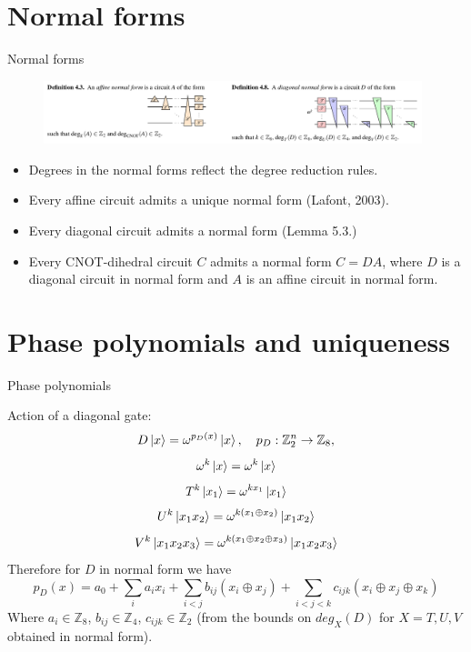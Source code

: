 \documentclass{beamer}
\theoremstyle{definition}
\begin{document}
\section{Normal forms}

\begin{frame}{Normal forms}

\begin{figure}
\includegraphics[width=11cm]{normal-forms}
\centering
\end{figure}
\begin{itemize}
\item Degrees in the normal forms reflect the degree reduction rules.
\item Every affine circuit admits a unique normal form (Lafont, 2003).
\item Every diagonal circuit admits a normal form (Lemma 5.3.)
\item Every CNOT-dihedral circuit $C$ admits a normal form $C=DA$, where $D$ is a diagonal circuit in normal form and $A$ is an affine circuit in normal form.
\end{itemize}
\end{frame}

\section{Phase polynomials and uniqueness}

\begin{frame}{Phase polynomials}

Action of a diagonal gate:
$$ D \ket{x} = \omega^{p_D(x)}\ket{x}, \quad p_D: \mathbb{Z}_2^n \rightarrow \mathbb{Z}_8 ,$$
$$ \omega^k \ket{x} = \omega^k \ket{x} $$
$$ T^k \ket{x_1} = \omega^{kx_1}\ket{x_1}$$
$$ U^k \ket{x_1x_2} = \omega^{k(x_1\oplus x_2)}\ket{x_1x_2}$$
$$ V^k \ket{x_1x_2x_3} = \omega^{k(x_1\oplus x_2 \oplus x_3)}\ket{x_1x_2x_3}$$
Therefore for $D$ in normal form we have
$$ p_D(x) = a_0 + \sum_i a_i x_i + \sum_{i<j}b_{ij} (x_i \oplus x_j) + \sum_{i<j<k}c_{ijk} (x_i \oplus x_j \oplus x_k)$$
Where $a_i \in \mathbb{Z}_8$, $b_{ij} \in \mathbb{Z}_4$, $c_{ijk} \in \mathbb{Z}_2$ (from the bounds on $deg_X(D)$ for $X=T,U,V$ obtained in normal form).

\end{frame}
\end{document}
